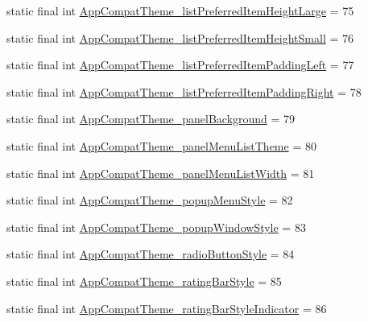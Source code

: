 \begin{DoxyCompactItemize}
\item 
static final int \mbox{\hyperlink{classandroid_1_1support_1_1design_1_1_r_1_1styleable_a56d0b3454c6ef692c0e5265ec61c86b9}{App\+Compat\+Theme\+\_\+list\+Preferred\+Item\+Height\+Large}} = 75
\item 
static final int \mbox{\hyperlink{classandroid_1_1support_1_1design_1_1_r_1_1styleable_a8a75f7d011f28c7940b2a0ee2418eaa4}{App\+Compat\+Theme\+\_\+list\+Preferred\+Item\+Height\+Small}} = 76
\item 
static final int \mbox{\hyperlink{classandroid_1_1support_1_1design_1_1_r_1_1styleable_a12564bc9b7d087833d6fbb43d38126f6}{App\+Compat\+Theme\+\_\+list\+Preferred\+Item\+Padding\+Left}} = 77
\item 
static final int \mbox{\hyperlink{classandroid_1_1support_1_1design_1_1_r_1_1styleable_a77c99eb3de957292fbc57a34b689b4c7}{App\+Compat\+Theme\+\_\+list\+Preferred\+Item\+Padding\+Right}} = 78
\item 
static final int \mbox{\hyperlink{classandroid_1_1support_1_1design_1_1_r_1_1styleable_a805750ce2fbfa308014705a11b57ba7d}{App\+Compat\+Theme\+\_\+panel\+Background}} = 79
\item 
static final int \mbox{\hyperlink{classandroid_1_1support_1_1design_1_1_r_1_1styleable_adfd08ba3f3407d2dd101b228d7ac760a}{App\+Compat\+Theme\+\_\+panel\+Menu\+List\+Theme}} = 80
\item 
static final int \mbox{\hyperlink{classandroid_1_1support_1_1design_1_1_r_1_1styleable_a421dc7ff1e048bc72a17a2c6f68ffce6}{App\+Compat\+Theme\+\_\+panel\+Menu\+List\+Width}} = 81
\item 
static final int \mbox{\hyperlink{classandroid_1_1support_1_1design_1_1_r_1_1styleable_adc61aa75dda72ba8d03af00d76d398ab}{App\+Compat\+Theme\+\_\+popup\+Menu\+Style}} = 82
\item 
static final int \mbox{\hyperlink{classandroid_1_1support_1_1design_1_1_r_1_1styleable_a7c26582c3bfe79830792407693d18411}{App\+Compat\+Theme\+\_\+popup\+Window\+Style}} = 83
\item 
static final int \mbox{\hyperlink{classandroid_1_1support_1_1design_1_1_r_1_1styleable_a7aaf0a5c2cd0ecf4edb0fdb371029f43}{App\+Compat\+Theme\+\_\+radio\+Button\+Style}} = 84
\item 
static final int \mbox{\hyperlink{classandroid_1_1support_1_1design_1_1_r_1_1styleable_abcb125deda6b4b6451124a6d80bde6e0}{App\+Compat\+Theme\+\_\+rating\+Bar\+Style}} = 85
\item 
static final int \mbox{\hyperlink{classandroid_1_1support_1_1design_1_1_r_1_1styleable_aa7a59377306592e0ef0df3be07070657}{App\+Compat\+Theme\+\_\+rating\+Bar\+Style\+Indicator}} = 86

\end{DoxyCompactItemize}
